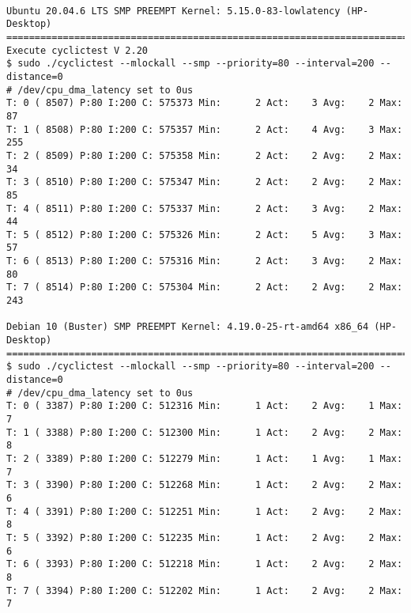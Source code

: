 \clearpage
\pagebreak
\begin{landscape}
	
\begin{lstlisting}[caption={App Realtime Latency Test for HP Desktop}, label=App Realtime Latency Test for HP Desktop]	

Ubuntu 20.04.6 LTS SMP PREEMPT Kernel: 5.15.0-83-lowlatency (HP-Desktop)
================================================================================
Execute cyclictest V 2.20
$ sudo ./cyclictest --mlockall --smp --priority=80 --interval=200 --distance=0
# /dev/cpu_dma_latency set to 0us
T: 0 ( 8507) P:80 I:200 C: 575373 Min:      2 Act:    3 Avg:    2 Max:      87
T: 1 ( 8508) P:80 I:200 C: 575357 Min:      2 Act:    4 Avg:    3 Max:     255
T: 2 ( 8509) P:80 I:200 C: 575358 Min:      2 Act:    2 Avg:    2 Max:      34
T: 3 ( 8510) P:80 I:200 C: 575347 Min:      2 Act:    2 Avg:    2 Max:      85
T: 4 ( 8511) P:80 I:200 C: 575337 Min:      2 Act:    3 Avg:    2 Max:      44
T: 5 ( 8512) P:80 I:200 C: 575326 Min:      2 Act:    5 Avg:    3 Max:      57
T: 6 ( 8513) P:80 I:200 C: 575316 Min:      2 Act:    3 Avg:    2 Max:      80
T: 7 ( 8514) P:80 I:200 C: 575304 Min:      2 Act:    2 Avg:    2 Max:     243

Debian 10 (Buster) SMP PREEMPT Kernel: 4.19.0-25-rt-amd64 x86_64 (HP-Desktop)
================================================================================
$ sudo ./cyclictest --mlockall --smp --priority=80 --interval=200 --distance=0
# /dev/cpu_dma_latency set to 0us
T: 0 ( 3387) P:80 I:200 C: 512316 Min:      1 Act:    2 Avg:    1 Max:       7
T: 1 ( 3388) P:80 I:200 C: 512300 Min:      1 Act:    2 Avg:    2 Max:       8
T: 2 ( 3389) P:80 I:200 C: 512279 Min:      1 Act:    1 Avg:    1 Max:       7
T: 3 ( 3390) P:80 I:200 C: 512268 Min:      1 Act:    2 Avg:    2 Max:       6
T: 4 ( 3391) P:80 I:200 C: 512251 Min:      1 Act:    2 Avg:    2 Max:       8
T: 5 ( 3392) P:80 I:200 C: 512235 Min:      1 Act:    2 Avg:    2 Max:       6
T: 6 ( 3393) P:80 I:200 C: 512218 Min:      1 Act:    2 Avg:    2 Max:       8
T: 7 ( 3394) P:80 I:200 C: 512202 Min:      1 Act:    2 Avg:    2 Max:       7
\end{lstlisting}

\end{landscape}
